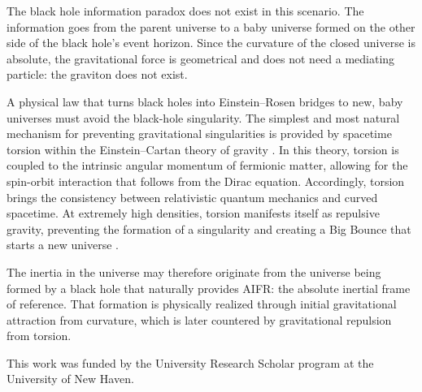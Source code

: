\documentclass[prl,twocolumn,nofootinbib]{revtex4}
\begin{document}
The black hole information paradox does not exist in this scenario.
The information goes from the parent universe to a baby universe formed on the other side of the black hole's event horizon.
Since the curvature of the closed universe is absolute, the gravitational force is geometrical and does not need a mediating particle: the graviton does not exist.

A physical law that turns black holes into Einstein--Rosen bridges to new, baby universes must avoid the black-hole singularity.
The simplest and most natural mechanism for preventing gravitational singularities is provided by spacetime torsion within the Einstein--Cartan theory of gravity \cite{Newton,EC}.
In this theory, torsion is coupled to the intrinsic angular momentum of fermionic matter, allowing for the spin-orbit interaction that follows from the Dirac equation.
Accordingly, torsion brings the consistency between relativistic quantum mechanics and curved spacetime.
At extremely high densities, torsion manifests itself as repulsive gravity, preventing the formation of a singularity and creating a Big Bounce that starts a new universe \cite{ApJ,avert}.

The inertia in the universe may therefore originate from the universe being formed by a black hole that naturally provides AIFR: the absolute inertial frame of reference.
That formation is physically realized through initial gravitational attraction from curvature, which is later countered by gravitational repulsion from torsion.


This work was funded by the University Research Scholar program at the University of New Haven.
\end{document}
